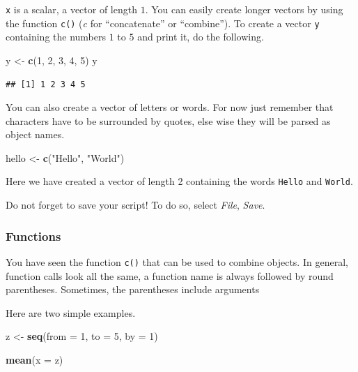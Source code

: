 \documentclass[]{book}
\newenvironment{Shaded}{\begin{snugshade}}{\end{snugshade}}
\newcommand{\KeywordTok}[1]{\textcolor[rgb]{0.13,0.29,0.53}{\textbf{#1}}}
\newcommand{\DataTypeTok}[1]{\textcolor[rgb]{0.13,0.29,0.53}{#1}}
\newcommand{\DecValTok}[1]{\textcolor[rgb]{0.00,0.00,0.81}{#1}}
\newcommand{\StringTok}[1]{\textcolor[rgb]{0.31,0.60,0.02}{#1}}
\newcommand{\NormalTok}[1]{#1}
\theoremstyle{definition}
\theoremstyle{definition}
\theoremstyle{definition}
\theoremstyle{remark}
\begin{document}
\texttt{x} is a scalar, a vector of length \(1\). You can easily create
longer vectors by using the function \texttt{c()} (\emph{c} for
``concatenate'' or ``combine''). To create a vector \texttt{y}
containing the numbers \(1\) to \(5\) and print it, do the following.

\begin{Shaded}
\begin{Highlighting}[]
\NormalTok{y <-}\StringTok{ }\KeywordTok{c}\NormalTok{(}\DecValTok{1}\NormalTok{, }\DecValTok{2}\NormalTok{, }\DecValTok{3}\NormalTok{, }\DecValTok{4}\NormalTok{, }\DecValTok{5}\NormalTok{)}
\NormalTok{y}
\end{Highlighting}
\end{Shaded}

\begin{verbatim}
## [1] 1 2 3 4 5
\end{verbatim}

You can also create a vector of letters or words. For now just remember
that characters have to be surrounded by quotes, else wise they will be
parsed as object names.

\begin{Shaded}
\begin{Highlighting}[]
\NormalTok{hello <-}\StringTok{ }\KeywordTok{c}\NormalTok{(}\StringTok{"Hello"}\NormalTok{, }\StringTok{"World"}\NormalTok{)}
\end{Highlighting}
\end{Shaded}

Here we have created a vector of length 2 containing the words
\texttt{Hello} and \texttt{World}.

Do not forget to save your script! To do so, select \emph{File},
\emph{Save}.

\subsubsection*{Functions}\label{functions}

You have seen the function \texttt{c()} that can be used to combine
objects. In general, function calls look all the same, a function name
is always followed by round parentheses. Sometimes, the parentheses
include arguments

Here are two simple examples.

\begin{Shaded}
\begin{Highlighting}[]
\NormalTok{z <-}\StringTok{ }\KeywordTok{seq}\NormalTok{(}\DataTypeTok{from =} \DecValTok{1}\NormalTok{, }\DataTypeTok{to =} \DecValTok{5}\NormalTok{, }\DataTypeTok{by =} \DecValTok{1}\NormalTok{)}

\KeywordTok{mean}\NormalTok{(}\DataTypeTok{x =}\NormalTok{ z)}
\end{Highlighting}
\end{Shaded}
\end{document}
